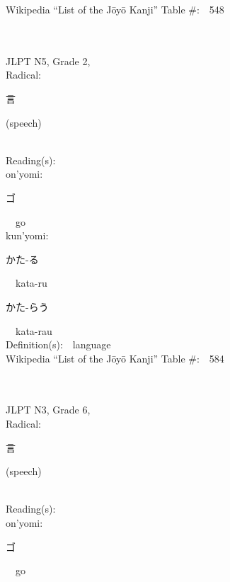 \begin{multicols}{2}
Wikipedia ``List of the J\=oy\=o Kanji'' Table \#:\ \ 548 \\
\ \ \\
{\fontsize{34pt}{40pt}  }\ \ \\  %
{JLPT N5, Grade 2, \\Radical:\ \ {\begin{CJK}{UTF8}{min} 言 \end{CJK}} (speech) } \\
Reading(s):\ \ \\
{\hspace*{1em}}on'yomi:\ \ \\
{\hspace*{2em}}{\begin{CJK}{UTF8}{min} ゴ \end{CJK}}\ \ go\ \ \\
{\hspace*{1em}}kun'yomi:\ \ \\
{\hspace*{2em}}{\begin{CJK}{UTF8}{min} かた-る \end{CJK}}\ \ kata-ru\ \ \\
{\hspace*{2em}}{\begin{CJK}{UTF8}{min} かた-らう \end{CJK}}\ \ kata-rau\ \ \\
Definition(s):\ \ language \\
Wikipedia ``List of the J\=oy\=o Kanji'' Table \#:\ \ 584 \\
\ \ \\
{\fontsize{34pt}{40pt}  }\ \ \\  %
{JLPT N3, Grade 6, \\Radical:\ \ {\begin{CJK}{UTF8}{min} 言 \end{CJK}} (speech) } \\
Reading(s):\ \ \\
{\hspace*{1em}}on'yomi:\ \ \\
{\hspace*{2em}}{\begin{CJK}{UTF8}{min} ゴ \end{CJK}}\ \ go\ \ \\

\end{multicols}
